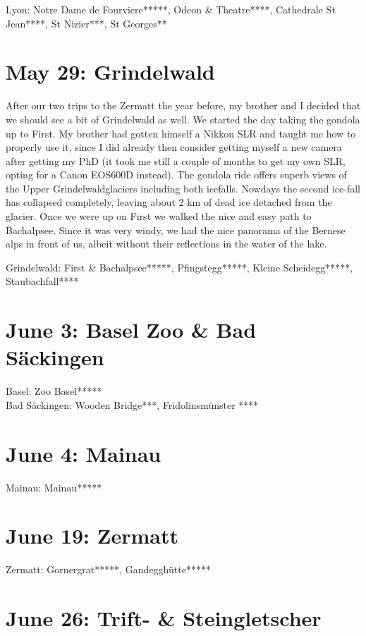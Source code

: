Lyon: Notre Dame de Fourviere*****, Odeon \& Theatre****, Cathedrale St Jean****, St Nizier***, St Georges**

\section{May 29: Grindelwald}
\label{Grindelwald2011}

After our two trips to the Zermatt the year before, my brother and I decided that we should see a bit of Grindelwald as well. We started the day taking the gondola up to First. My brother had gotten himself a Nikkon SLR and taught me how to properly use it, since I did already then consider getting myself a new camera after getting my PhD (it took me still a couple of months to get my own SLR, opting for a Canon EOS600D instead). The gondola ride offers superb views of the Upper Grindelwaldglaciers including both icefalls. Nowdays the second ice-fall has collapsed completely, leaving about 2 km of dead ice detached from the glacier. Once we were up on First we walked the nice and easy path to Bachalpsee. Since it was very windy, we had the nice panorama of the Bernese alps in front of us, albeit without their reflections in the water of the lake. 

Grindelwald: First \& Bachalpsee*****, Pfingstegg*****, Kleine Scheidegg*****, Staubachfall****

\section{June 3: Basel Zoo \& Bad S\"ackingen}
\label{Basel2011}

Basel: Zoo Basel*****\\
Bad S\"ackingen: Wooden Bridge***, Fridolinsm\"unster ****

\section{June 4: Mainau}
\label{Mainau2011}

Mainau: Mainau*****

\section{June 19: Zermatt}
\label{Zermatt2011}

Zermatt: Gornergrat*****, Gandeggh\"utte*****

\section{June 26: Trift- \& Steingletscher}
\label{Gadmen}

